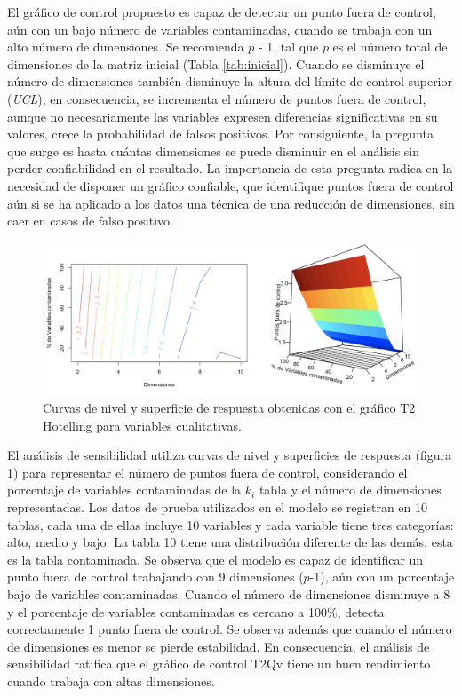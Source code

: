 \documentclass[water,article,submit,moreauthors,pdftex]{mdpi}
\begin{document}
El gráfico de control propuesto es capaz de detectar un punto fuera de
control, aún con un bajo número de variables contaminadas, cuando se
trabaja con un alto número de dimensiones. Se recomienda \(p\) - 1, tal
que \(p\) es el número total de dimensiones de la matriz inicial (Tabla
\ref{tab:inicial}). Cuando se disminuye el número de dimensiones también
disminuye la altura del límite de control superior (\emph{UCL}), en
consecuencia, se incrementa el número de puntos fuera de control, aunque
no necesariamente las variables expresen diferencias significativas en
su valores, crece la probabilidad de falsos positivos. Por consiguiente,
la pregunta que surge es hasta cuántas dimensiones se puede disminuir en
el análisis sin perder confiabilidad en el resultado. La importancia de
esta pregunta radica en la necesidad de disponer un gráfico confiable,
que identifique puntos fuera de control aún si se ha aplicado a los
datos una técnica de una reducción de dimensiones, sin caer en casos de
falso positivo.

\begin{figure}[!ht]



\begin{center}\includegraphics[width=0.8\linewidth,]{conjuntosensibilidad} \end{center}

\caption{Curvas de nivel y superficie de respuesta obtenidas con el gráfico T2 Hotelling para variables cualitativas.}

\label{fig:sensibilidad}
\end{figure}

El análisis de sensibilidad utiliza curvas de nivel y superficies de
respuesta (figura \ref{fig:sensibilidad}) para representar el número de
puntos fuera de control, considerando el porcentaje de variables
contaminadas de la \(k_i\) tabla y el número de dimensiones
representadas. Los datos de prueba utilizados en el modelo se registran
en 10 tablas, cada una de ellas incluye 10 variables y cada variable
tiene tres categorías: alto, medio y bajo. La tabla 10 tiene una
distribución diferente de las demás, esta es la tabla contaminada. Se
observa que el modelo es capaz de identificar un punto fuera de control
trabajando con 9 dimensiones (\(p\)-1), aún con un porcentaje bajo de
variables contaminadas. Cuando el número de dimensiones disminuye a 8 y
el porcentaje de variables contaminadas es cercano a 100\%, detecta
correctamente 1 punto fuera de control. Se observa además que cuando el
número de dimensiones es menor se pierde estabilidad. En consecuencia,
el análisis de sensibilidad ratifica que el gráfico de control T2Qv
tiene un buen rendimiento cuando trabaja con altas dimensiones.
\end{document}
